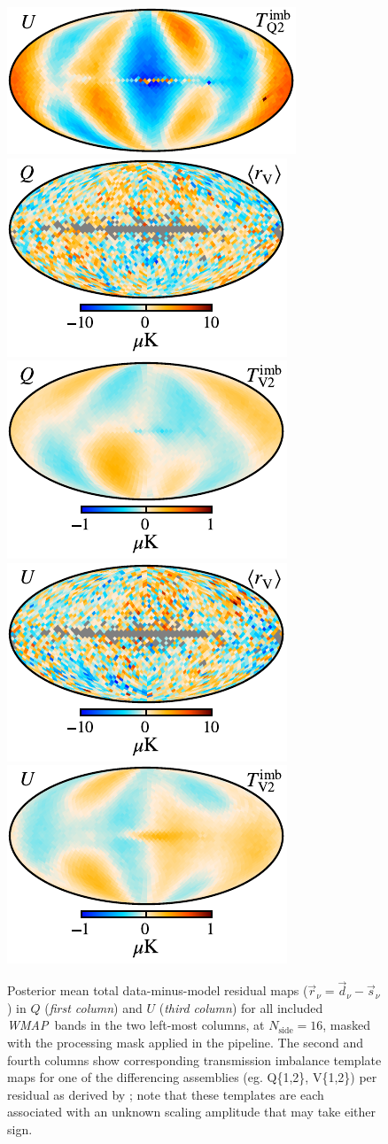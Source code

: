 \documentclass[twocolumn]{aa}
\def\WMAP{\textit{WMAP}}
\def\nside{N_{\mathrm{side}}}
\renewcommand{\d}[0]{\vec{d}}
\newcommand{\s}[0]{\vec{s}}
\renewcommand{\r}[0]{\vec{r}}
\newcommand{\?}[1]{\textcolor{red}{{\bf [#1]}}}
\begin{document}
\begin{figure}[t]
\includegraphics[width=.23\linewidth]{figs/wmap_loss_imbalance_template1_Q2_v5_iqu_U_w7_n16_c-planck.pdf}\\
\includegraphics[width=.23\linewidth]{figs/BP_res_061-WMAP_V_P_QU_0arcmin_uK_v2_Q_MEAN_w7_n16_cb_masked_c-planck.pdf}
\includegraphics[width=.23\linewidth]{figs/wmap_loss_imbalance_template1_V2_v5_iqu_Q_w7_n16_cb_c-planck.pdf}\hspace*{5mm}
\includegraphics[width=.23\linewidth]{figs/BP_res_061-WMAP_V_P_QU_0arcmin_uK_v2_U_MEAN_w7_n16_cb_masked_c-planck.pdf}
\includegraphics[width=.23\linewidth]{figs/wmap_loss_imbalance_template1_V2_v5_iqu_U_w7_n16_cb_c-planck.pdf}
\caption{Posterior mean total data-minus-model residual maps
($\r_{\nu}=\d_{\nu}-\s_{\nu}$) in $Q$ (\emph{first column}) and $U$ (\emph{third
column}) for all included \WMAP\ bands in the two left-most columns, at
$\nside=16$, masked with the processing mask applied in the pipeline. The second
and fourth columns show corresponding transmission imbalance template maps for
one of the differencing assemblies (eg. Q\{1,2\}, V\{1,2\}) per residual as derived by
\citet{jarosik2007}; note that these templates are each associated with an
unknown scaling amplitude that may take either sign.}
\label{fig:reswmap}
\end{figure}
\end{document}
